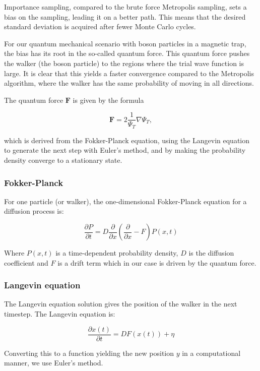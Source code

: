 \documentclass[
]{article}
\begin{document}
Importance sampling, compared to the brute force Metropolis sampling,
sets a bias on the sampling, leading it on a better path. This means
that the desired standard deviation is acquired after fewer Monte Carlo
cycles.

For our quantum mechanical scenario with boson particles in a magnetic
trap, the bias has its root in the so-called quantum force. This quantum
force pushes the walker (the boson particle) to the regions where the
trial wave function is large. It is clear that this yields a faster
convergence compared to the Metropolis algorithm, where the walker has
the same probability of moving in all directions.

The quantum force \(\mathbf{F}\) is given by the formula

\[ \mathbf{F}=2 \frac{1}{\Psi_{T}} \nabla \Psi_{T}, \]

which is derived from the Fokker-Planck equation, using the Langevin
equation to generate the next step with Euler's method, and by making
the probability density converge to a stationary state.

\hypertarget{fokker-planck}{%
\subsubsection{Fokker-Planck}\label{fokker-planck}}

For one particle (or walker), the one-dimensional Fokker-Planck equation
for a diffusion process is:

\[ \frac{\partial P}{\partial t}=D \frac{\partial}{\partial x}\left(\frac{\partial}{\partial x}-F\right) P(x, t) \]

Where \(P(x,t)\) is a time-dependent probability density, \(D\) is the
diffusion coefficient and \(F\) is a drift term which in our case is
driven by the quantum force.

\hypertarget{langevin-equation}{%
\subsubsection{Langevin equation}\label{langevin-equation}}

The Langevin equation solution gives the position of the walker in the
next timestep. The Langevin equation is:

\[ \frac{\partial x(t)}{\partial t}=D F(x(t))+\eta \]

Converting this to a function yielding the new position \(y\) in a
computational manner, we use Euler's method.
\end{document}

